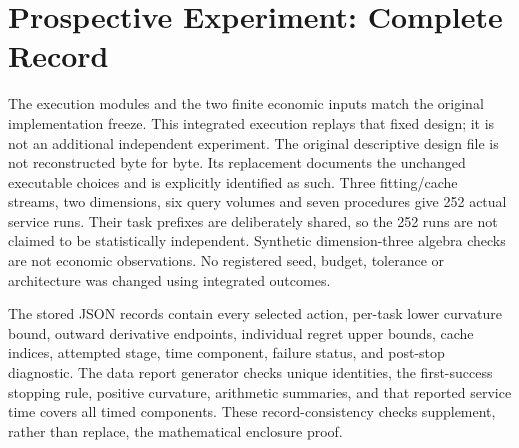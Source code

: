\section{Prospective Experiment: Complete Record}\label{app:r19record}
The execution modules and the two finite economic inputs match the original
implementation freeze. This integrated execution replays that fixed design;
it is not an additional independent experiment. The original descriptive
design file is not reconstructed byte for byte. Its replacement documents
the unchanged executable choices and is explicitly identified as such.
Three fitting/cache streams, two dimensions, six query volumes and seven
procedures give 252 actual service runs. Their task prefixes are deliberately
shared, so the 252 runs are not claimed to be statistically independent.
Synthetic dimension-three algebra checks are not economic observations.
No registered seed, budget, tolerance or architecture was changed using
integrated outcomes.

The stored JSON records contain every selected action, per-task lower curvature
bound, outward derivative endpoints, individual regret upper bounds, cache
indices, attempted stage, time component, failure status, and post-stop diagnostic.
The data report generator checks unique identities, the first-success stopping
rule, positive curvature, arithmetic summaries, and that reported service time
covers all timed components. These record-consistency checks supplement, rather
than replace, the mathematical enclosure proof.

